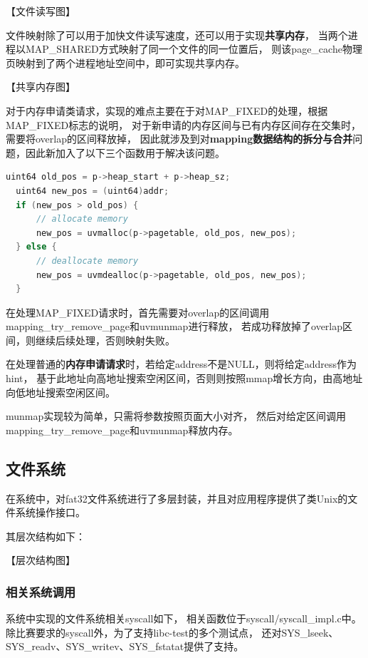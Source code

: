 \documentclass[UTF8,a4paper,10pt]{ctexart}
\begin{document}
【文件读写图】

文件映射除了可以用于加快文件读写速度，还可以用于实现\textbf{共享内存}，
当两个进程以MAP\_SHARED方式映射了同一个文件的同一位置后，
则该page\_cache物理页映射到了两个进程地址空间中，即可实现共享内存。

【共享内存图】

对于内存申请类请求，实现的难点主要在于对MAP\_FIXED的处理，根据MAP\_FIXED标志的说明，
对于新申请的内存区间与已有内存区间存在交集时，需要将overlap的区间释放掉，
因此就涉及到对\textbf{mapping数据结构的拆分与合并}问题，因此新加入了以下三个函数用于解决该问题。

\begin{lstlisting}[title=mapping数据结构的拆分与合并,frame=trbl,language={C}]
  uint64 old_pos = p->heap_start + p->heap_sz;
  uint64 new_pos = (uint64)addr;
  if (new_pos > old_pos) {
      // allocate memory
      new_pos = uvmalloc(p->pagetable, old_pos, new_pos);
  } else {
      // deallocate memory
      new_pos = uvmdealloc(p->pagetable, old_pos, new_pos);
  }
  \end{lstlisting}


在处理MAP\_FIXED请求时，首先需要对overlap的区间调用mapping\_try\_remove\_page和uvmunmap进行释放，
若成功释放掉了overlap区间，则继续后续处理，否则映射失败。

在处理普通的\textbf{内存申请请求}时，若给定address不是NULL，则将给定address作为hint，
基于此地址向高地址搜索空闲区间，否则则按照mmap增长方向，由高地址向低地址搜索空闲区间。

munmap实现较为简单，只需将参数按照页面大小对齐，
然后对给定区间调用mapping\_try\_remove\_page和uvmunmap释放内存。

\subsection{文件系统}

在系统中，对fat32文件系统进行了多层封装，并且对应用程序提供了类Unix的文件系统操作接口。

其层次结构如下：

【层次结构图】

\subsubsection{相关系统调用}

系统中实现的文件系统相关syscall如下，
相关函数位于syscall/syscall\_impl.c中。
除比赛要求的syscall外，为了支持libc-test的多个测试点，
还对SYS\_lseek、SYS\_readv、SYS\_writev、SYS\_fstatat提供了支持。
\end{document}
